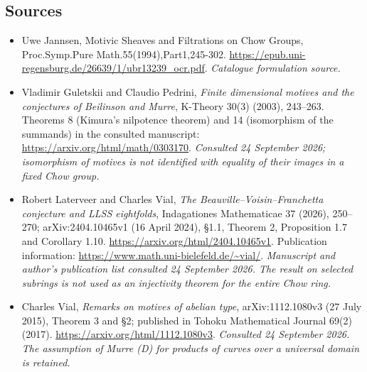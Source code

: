 \documentclass[11pt]{article}
\begin{document}
\subsection{Sources}
\begin{itemize}\raggedright
\item[\textnormal{[S1]}]\hypertarget{source:30006755:1}{} Uwe Jannsen, Motivic Sheaves and Filtrations on Chow Groups, Proc.Symp.Pure Math.55(1994),Part1,245-302.
\url{https://epub.uni-regensburg.de/26639/1/ubr13239_ocr.pdf}.
{\small\textit{Catalogue formulation source.}}
\item[\textnormal{[E1]}]\hypertarget{extra:30006755:1}{} Vladimir Guletskii and
Claudio Pedrini, \emph{Finite dimensional motives and the conjectures of
Beilinson and Murre}, K-Theory 30(3) (2003), 243--263.
Theorems 8 (Kimura's nilpotence theorem) and 14 (isomorphism of the summands)
in the consulted manuscript:
\url{https://arxiv.org/html/math/0303170}.
{\small\textit{Consulted 24 September 2026; isomorphism of motives is not
identified with equality of their images in a fixed Chow group.}}
\item[\textnormal{[E2]}]\hypertarget{extra:30006755:2}{} Robert Laterveer and Charles
Vial, \emph{The Beauville--Voisin--Franchetta conjecture and LLSS eightfolds},
Indagationes Mathematicae 37 (2026), 250--270;
arXiv:2404.10465v1 (16 April 2024), \S1.1, Theorem 2, Proposition 1.7 and
Corollary 1.10.
\url{https://arxiv.org/html/2404.10465v1}.
Publication information:
\url{https://www.math.uni-bielefeld.de/~vial/}.
{\small\textit{Manuscript and author's publication list consulted
24 September 2026. The result on selected subrings is not used as an
injectivity theorem for the entire Chow ring.}}
\item[\textnormal{[E3]}]\hypertarget{extra:30006755:3}{} Charles Vial,
\emph{Remarks on motives of abelian type}, arXiv:1112.1080v3
(27 July 2015), Theorem 3 and \S2; published in Tohoku Mathematical Journal
69(2) (2017).
\url{https://arxiv.org/html/1112.1080v3}.
{\small\textit{Consulted 24 September 2026. The assumption of Murre (D)
for products of curves over a universal domain is retained.}}
\end{itemize}
\end{document}
